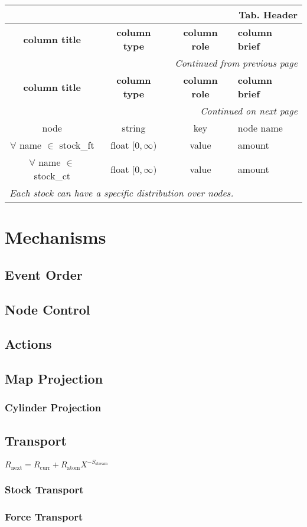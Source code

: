 \documentclass[a4paper,oneside,titlepage]{report}
\newcommand*{\LTHeaderIV}[5]{
  \multicolumn{4}{r}{\textbf{Tab. \thesubsection} \textbf{#1}}\\    
  \hline
  \textbf{#2} & \textbf{#3} & \textbf{#4} & \textbf{#5}\\
  \hline
  
  \endfirsthead
  \multicolumn{4}{r}{\textit{Continued from previous page}}\\    
  \hline
  \textbf{#2} & \textbf{#3} & \textbf{#4} & \textbf{#5}\\
  \hline
  \endhead
  \hline
  \multicolumn{4}{r}{\textit{Continued on next page}}\\
  \endfoot
  \hline
  \endlastfoot  
}
\begin{document}
\begin{longtable}{ |c|c|c|l| } 
  \LTHeaderIV{Header}{column title}{column type}{column role}{column brief}                    
  node & string & key & node name\\
  $\forall$ name $\in$ stock\_ft & float $[0, \infty)$ & value & amount \\
  $\forall$ name $\in$ stock\_ct & float $[0, \infty)$ & value & amount \\
  \multicolumn{4}{|l|}{\textit{Each stock can have a specific distribution over nodes.}}\\
\end{longtable}        

\chapter{Mechanisms}

\section{Event Order}
\section{Node Control}
\section{Actions}

\section{Map Projection}
\subsection{Cylinder Projection}
	
\section{Transport}
$R_{\mathrm{next}} = R_{\mathrm{curr}} + R_{\mathrm{atom}} X^{-S_{\mathrm{stream}}}$
\subsection{Stock Transport}
\subsection{Force Transport} 
\end{document}
